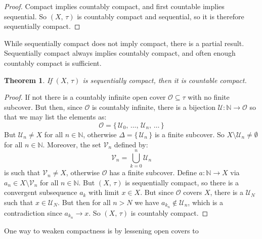 \documentclass{article}
\theoremstyle{plain}
\newtheorem{theorem}{Theorem}[section]
\theoremstyle{normal}
\begin{document}
        \begin{proof}
            Compact implies countably compact, and first countable implies
            sequential. So $(X,\,\tau)$ is countably compact and sequential,
            so it is therefore sequentially compact.
        \end{proof}
        While sequentially compact does not imply compact, there is a partial
        result. Sequentially compact always implies countably compact, and
        often enough countably compact is sufficient.
        \begin{theorem}
            If $(X,\,\tau)$ is sequentially compact, then it is
            countable compact.
        \end{theorem}
        \begin{proof}
            If not there is a countably infinite open cover
            $\mathcal{O}\subseteq\tau$ with no finite subcover. But then,
            since $\mathcal{O}$ is countably infinite, there is a bijection
            $\mathcal{U}:\mathbb{N}\rightarrow\mathcal{O}$ so that we may
            list the elements as:
            \begin{equation}
                \mathcal{O}=
                \{\,\mathcal{U}_{0},\,\dots,\,\mathcal{U}_{n},\,\dots\,\}
            \end{equation}
            But $\mathcal{U}_{n}\ne{X}$ for all $n\in\mathbb{N}$, otherwise
            $\Delta=\{\,\mathcal{U}_{n}\,\}$ is a finite subcover. So
            $X\setminus\mathcal{U}_{n}\ne\emptyset$ for all $n\in\mathbb{N}$.
            Moreover, the set $\mathcal{V}_{n}$ defined by:
            \begin{equation}
                \mathcal{V}_{n}=\bigcup_{k=0}^{n}\mathcal{U}_{n}
            \end{equation}
            is such that $\mathcal{V}_{n}\ne{X}$, otherwise $\mathcal{O}$ has a
            finite subcover. Define $a:\mathbb{N}\rightarrow{X}$ via
            $a_{n}\in{X}\setminus\mathcal{V}_{n}$ for all $n\in\mathbb{N}$.
            But $(X,\,\tau)$ is sequentially compact, so there is a
            convergent subsequence $a_{k}$ with limit $x\in{X}$. But since
            $\mathcal{O}$ covers $X$, there is a $\mathcal{U}_{N}$ such
            that $x\in\mathcal{U}_{N}$. But then for all
            $n>N$ we have $a_{k_{n}}\not\in\mathcal{U}_{n}$, which is a
            contradiction since $a_{k_{n}}\rightarrow{x}$. So
            $(X,\,\tau)$ is countably compact.
        \end{proof}
        One way to weaken compactness is by lessening open covers to
\end{document}
